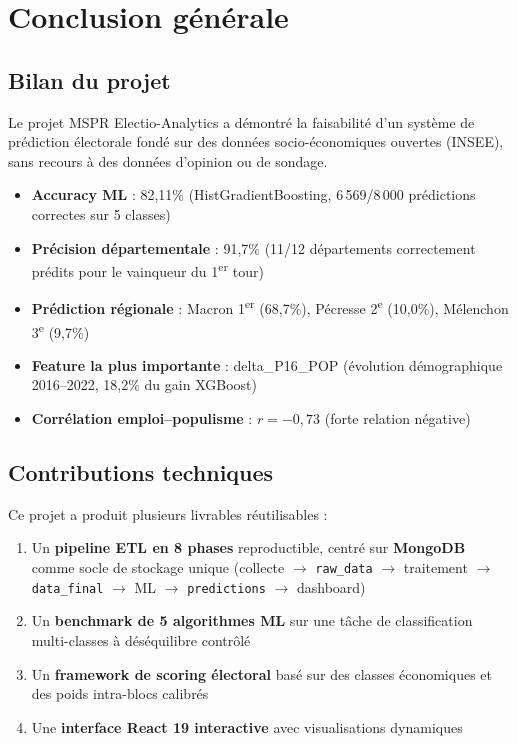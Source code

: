 \chapter*{Conclusion générale}

\section*{Bilan du projet}

Le projet MSPR Electio-Analytics a démontré la faisabilité d'un système de prédiction
électorale fondé sur des données socio-économiques ouvertes (INSEE), sans recours à
des données d'opinion ou de sondage.

\begin{resultbox}
\begin{itemize}
  \item \textbf{Accuracy ML} : 82,11\% (HistGradientBoosting, 6\,569/8\,000
    prédictions correctes sur 5 classes)
  \item \textbf{Précision départementale} : 91,7\% (11/12 départements correctement
    prédits pour le vainqueur du 1\textsuperscript{er} tour)
  \item \textbf{Prédiction régionale} : Macron 1\textsuperscript{er} (68,7\%),
    Pécresse 2\textsuperscript{e} (10,0\%), Mélenchon 3\textsuperscript{e} (9,7\%)
  \item \textbf{Feature la plus importante} : delta\_P16\_POP (évolution démographique
    2016--2022, 18,2\% du gain XGBoost)
  \item \textbf{Corrélation emploi--populisme} : $r = -0{,}73$ (forte relation négative)
\end{itemize}
\end{resultbox}

\section*{Contributions techniques}

Ce projet a produit plusieurs livrables réutilisables :
\begin{enumerate}
  \item Un \textbf{pipeline ETL en 8 phases} reproductible, centré sur \textbf{MongoDB}
    comme socle de stockage unique (collecte $\to$ \texttt{raw\_data} $\to$
    traitement $\to$ \texttt{data\_final} $\to$ ML $\to$ \texttt{predictions} $\to$ dashboard)
  \item Un \textbf{benchmark de 5 algorithmes ML} sur une tâche de classification
    multi-classes à déséquilibre contrôlé
  \item Un \textbf{framework de scoring électoral} basé sur des classes économiques
    et des poids intra-blocs calibrés
  \item Une \textbf{interface React 19 interactive} avec visualisations dynamiques
\end{enumerate}

